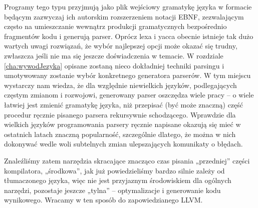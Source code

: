 Programy tego typu przyjmują jako plik wejściowy gramatykę języka w formacie będącym zazwyczaj ich autorskim rozszerzeniem notacji EBNF, zezwalającym często na umieszczanie wewnątrz produkcji gramatycznych bezpośrednio fragmentów kodu i generują parser. Oprócz lexa i yacca obecnie istnieje tak dużo wartych uwagi rozwiązań, że wybór najlepszej opcji może okazać się trudny, zwłaszcza jeśli nie ma się jeszcze doświadczenia w temacie. W rozdziale \ref{cha:wywodJezyka} opisane zostaną nieco dokładniej techniki parsingu i umotywowany zostanie wybór konkretnego generatora parserów. W tym miejscu wystarczy nam wiedza, że dla względnie niewielkich języków, podlegających częstym zmianom i rozwojowi, generowany parser oszczędza wiele pracy – o wiele łatwiej jest zmienić gramatykę języka, niż przepisać (być może znaczną) część procedur ręcznie pisanego parsera rekursywnie schodzącego. Wprawdzie dla wielkich języków programowania parsery ręcznie napisane okazują się mieć w ostatnich latach znaczną popularność, szczególnie dlatego, że można w nich dokonywać wedle woli subtelnych zmian ulepszających komunikaty o błędach.

Znaleźliśmy zatem narzędzia skracające znacząco czas pisania „przedniej” części kompilatora, „środkowa”, jak już powiedzieliśmy bardzo silnie zależy od tłumaczonego języka, więc nie jest przyjaznym środowiskiem dla ogólnych narzędzi, pozostaje jeszcze „tylna” – optymalizacje i generowanie kodu wynikowego. Wracamy w ten sposób do zapowiedzianego LLVM. 

